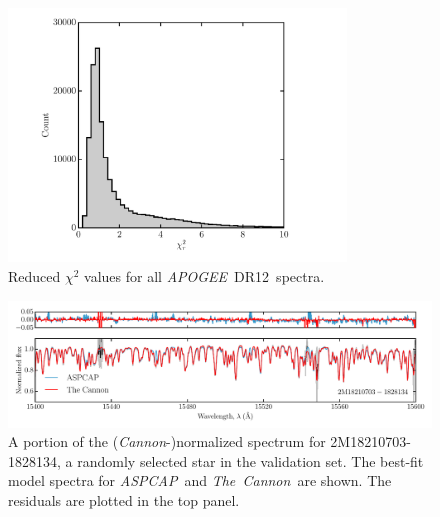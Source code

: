 \documentclass[12pt,preprint]{aastex}
\newcommand{\project}[1]{\textsl{#1}}
\newcommand{\TheCannon}{\project{The~Cannon}}
\newcommand{\acronym}[1]{{\small{#1}}}
\newcommand{\apogee}{\project{\acronym{APOGEE}}}
\newcommand{\aspcap}{\project{\acronym{ASPCAP}}}
\newcommand{\dr}{\acronym{DR12}}
\begin{document}
\begin{figure}[p]
\centering
\includegraphics[width=0.8\textwidth]{test-step-chisq.pdf}
\caption{Reduced $\chi^2$ values for all \apogee\ \dr\ spectra.\label{fig:chisq-test-set}}
\end{figure}

\clearpage

\begin{figure}[p]
\centering
\includegraphics[width=\textwidth]{spectrum.pdf}
\caption{A portion of the (\emph{Cannon}-)normalized spectrum for 2M18210703-1828134,
a randomly selected star in the validation set.  The best-fit model spectra
for \aspcap\ and \TheCannon\ are shown. The residuals are plotted in the top panel.\label{fig:correctness}}
\end{figure}

\clearpage
\end{document}
